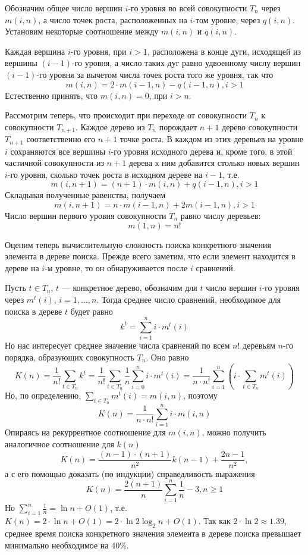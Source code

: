 \documentclass[12pt,a4paper]{article}
\theoremstyle{plain}
\theoremstyle{definition}
\theoremstyle{remark}
\begin{document}
Обозначим общее число вершин $i$-го уровня во всей совокупности $T_n$ через $m(i,n)$, а число точек роста, расположенных на $i$-том уровне, через $q(i,n)$. Установим некоторые соотношение между $m(i,n)$ и $q(i,n)$.

Каждая вершина $i$-го уровня, при $i>1$, расположена в конце дуги, исходящей из вершины $(i-1)$-го уровня, а число таких дуг равно удвоенному числу вершин $(i-1)$-го уровня за вычетом числа точек роста того же уровня, так что
\[ m(i,n) = 2\cdot m(i-1,n) - q(i-1,n), i>1 \]
Естественно принять, что $m(i,n)=0$, при $i>n$.

Рассмотрим теперь, что происходит при переходе от совокупности $T_n$ к совокупности $T_{n+1}$. Каждое дерево из $T_n$ порождает $n+1$ дерево совокупности $T_{n+1}$ соответственно его $n+1$ точке роста. В каждом из этих деревьев на уровне $i$ сохраняются все вершины $i$-го уровня исходного дерева и, кроме того, в этой частичной совокупности из $n+1$ дерева к ним добавится столько новых вершин $i$-го уровня, сколько точек роста в исходном дереве на $i-1$, т.е.
\[ m(i,n+1) = (n+1)\cdot m(i,n)+q(i-1,n), i>1 \]
Складывая полученные равенства, получаем
\[ m(i,n+1) = n\cdot m(i-1,n)+2m(i-1,n), i>1 \]
Число вершин первого уровня совокупности $T_n$ равно числу деревьев:
\[ m(1,n)=n! \]

Оценим теперь вычислительную сложность поиска конкретного значения элемента в дереве поиска. Прежде всего заметим, что если элемент находится в дереве на $i$-м уровне, то он обнаруживается после $i$ сравнений.

Пусть $t\in T_n$, $t$ --- конкретное дерево, обозначим для $t$ число вершин $i$-го уровня через $m^t(i)$, $i=1,\ldots,n$. Тогда среднее число сравнений, необходимое для поиска в дереве $t$ будет равно
\[ k^t = \sum_{i=1}^n i\cdot m^t(i) \]
Но нас интересует среднее значение числа сравнений по всем $n!$ деревьям $n$-го порядка, образующих совокупность $T_n$. Оно равно
\[ K(n) = \frac{1}{n!} \sum_{t\in T_n} k^t = \frac{1}{n!} \sum_{t\in T_n} \frac{1}{n} \sum_{i=0}^n i \cdot m^t(i) = \frac{1}{n\cdot n!} \sum_{i=1}^n (i \cdot \sum_{t\in T_n} m^t(i)) \]
Но, по определению, $ \sum_{t\in T_n} m^t(i) = m(i, n)$, поэтому
\[ K(n) = \frac{1}{n\cdot n!} \sum_{i=1}^n i\cdot m(i,n) \]
Опираясь на рекуррентное соотношение для $m(i,n)$, можно получить аналогичное соотношение для $k(n)$
\[ K(n) = \frac{(n-1)\cdot(n+1)}{n^2} k(n-1) + \frac{2n-1}{n^2}, \]
а с его помощью доказать (по индукции) справедливость выражения
\[ K(n) = \frac{2(n+1)}{n} \sum_{i=1}^n \frac{1}{n} -3, n \ge 1 \]
Но $\sum_{i=1}^n \frac{1}{n} = \ln n + O(1)$, т.е. $K(n) = 2\cdot\ln n + O(1) = 2\cdot\ln 2 \log_2 n + O(1)$. Так как $2\cdot\ln 2 \approx 1.39$, среднее время поиска конкретного значения элемента в дереве поиска превышает минимально необходимое на 40\%.
\end{document}
